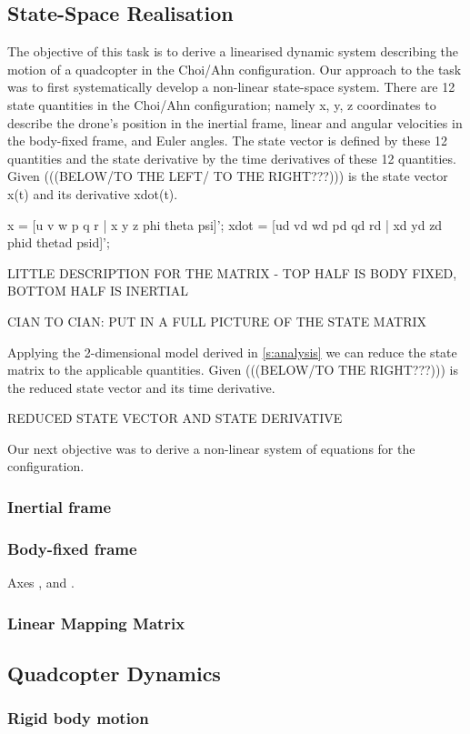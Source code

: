 \subsection{State-Space Realisation}
The objective of this task is to derive a linearised dynamic system describing the motion of a quadcopter in the Choi/Ahn configuration. Our approach to the task was to first systematically develop a non-linear state-space system. There are 12 state quantities in the Choi/Ahn configuration; namely x, y, z coordinates to describe the drone's position in the inertial frame, linear and angular velocities in the body-fixed frame, and Euler angles. The state vector is defined by these 12 quantities and the state derivative by the time derivatives of these 12 quantities. Given (((BELOW/TO THE LEFT/ TO THE RIGHT???))) is the state vector x(t) and its derivative xdot(t).

x = [u v w p q r | x y z phi theta psi]';
xdot = [ud vd wd pd qd rd | xd yd zd phid thetad psid]';

LITTLE DESCRIPTION FOR THE MATRIX - TOP HALF IS BODY FIXED, BOTTOM HALF IS INERTIAL

CIAN TO CIAN: PUT IN A FULL PICTURE OF THE STATE MATRIX

Applying the 2-dimensional model derived in \cref{s:analysis} we can reduce the state matrix to the applicable quantities. Given (((BELOW/TO THE RIGHT???))) is the reduced state vector and its time derivative.

REDUCED STATE VECTOR AND STATE DERIVATIVE

Our next objective was to derive a non-linear system of equations for the configuration.

\subsubsection[Inertial frame]{Inertial frame } %
\subsubsection[Body-fixed frame]{Body-fixed frame }
Axes ,  and .
\subsubsection[Linear Mapping Matrix]{Linear Mapping Matrix }
\label{sss:lmapmatQ}

\subsection{Quadcopter Dynamics}
\subsubsection{Rigid body motion}
\label{rigid-body-motion}
